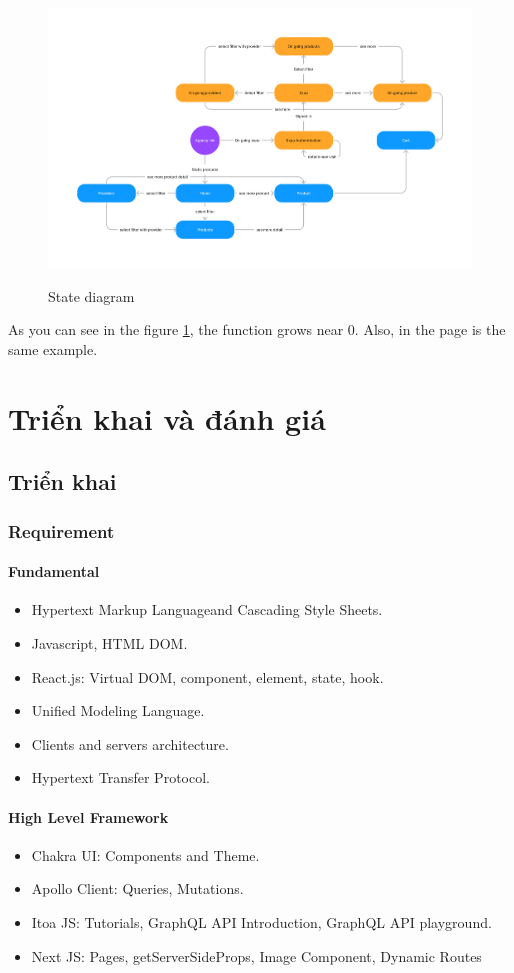 \documentclass{report}
\begin{document}
\begin{figure}[h]
	\caption{State diagram}
	\centering
	\includegraphics[width=\textwidth]{./images/state.png}
	\label{fig:state}
\end{figure}
As you can see in the figure \ref{fig:state}, the function grows near 0. Also, in the page \pageref{fig:state} is the same example.\pageref{fig:state}


\part{Triển khai và đánh giá}
\chapter{Triển khai}
\section{Requirement}
\subsection{Fundamental}
\begin{itemize}
	\item Hypertext Markup Languageand Cascading Style Sheets.
	\item Javascript, HTML DOM.
  	\item React.js: Virtual DOM, component, element, state, hook.
	\item Unified Modeling Language.
	\item Clients and servers architecture.
	\item Hypertext Transfer Protocol.
\end{itemize}

\subsection{High Level Framework}
\begin{itemize}
\item Chakra UI: Components and Theme.
\item Apollo Client: Queries, Mutations.
\item Itoa JS: Tutorials, GraphQL API Introduction, GraphQL API playground.
\item Next JS: Pages, getServerSideProps, Image Component, Dynamic Routes
\end{itemize}
\end{document}
